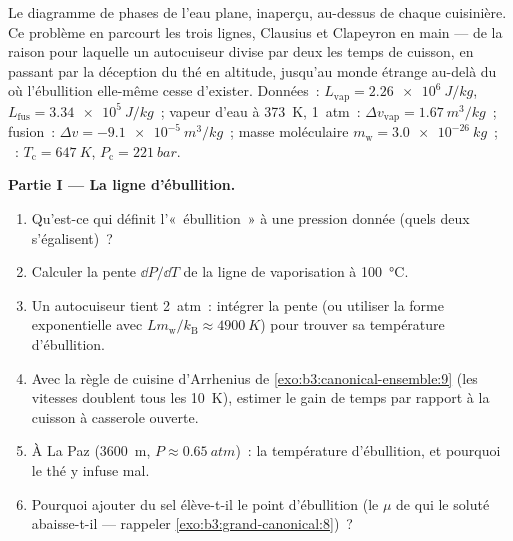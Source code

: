 \begin{problem}\label{pb:b3:phase-transitions:1}
Le diagramme de phases de l'eau plane, inaperçu, au-dessus de chaque
cuisinière. Ce problème en parcourt les trois lignes, Clausius et
Clapeyron en main --- de la raison pour laquelle un autocuiseur
divise par deux les temps de cuisson, en passant par la déception du
thé en altitude, jusqu'au monde étrange au-delà du  où
l'ébullition elle-même cesse d'exister. Données~: $L_{\text{vap}}
= \qty{2.26e6}{J/kg}$, $L_{\text{fus}} = \qty{3.34e5}{J/kg}$~;
vapeur d'eau à \qty{373}{K}, \qty{1}{atm}~: $\Delta v_{\text{vap}}
= \qty{1.67}{m^3/kg}$~; fusion~: $\Delta v = \qty{-9.1e-5}{m^3/kg}$~;
masse moléculaire $m_{\text{w}} = \qty{3.0e-26}{kg}$~; ~: $T_{\text{c}} = \qty{647}{K}$,
$P_{\text{c}} = \qty{221}{bar}$.

\medskip\noindent\textbf{Partie I --- La ligne d'ébullition.}
\begin{enumerate}
  \item Qu'est-ce qui définit l'«~ébullition~» à une pression
        donnée (quels deux  s'égalisent)~?
  \item Calculer la pente $\dd P/\dd T$ de la ligne de
        vaporisation à \qty{100}{\celsius}.
  \item Un autocuiseur tient \qty{2}{atm}~: intégrer la pente (ou
        utiliser la forme exponentielle avec $Lm_{\text{w}}/
        k_{\text{B}} \approx \qty{4900}{K}$) pour trouver sa
        température d'ébullition.
  \item Avec la règle de cuisine d'Arrhenius de
        \cref{exo:b3:canonical-ensemble:9} (les vitesses doublent
        tous les \qty{10}{K}), estimer le gain de temps par rapport
        à la cuisson à casserole ouverte.
  \item À La Paz (\qty{3600}{m}, $P \approx \qty{0.65}{atm}$)~: la
        température d'ébullition, et pourquoi le thé y infuse mal.
  \item Pourquoi ajouter du sel élève-t-il le point d'ébullition
        (le $\mu$ de qui le soluté abaisse-t-il --- rappeler
        \cref{exo:b3:grand-canonical:8})~?
\end{enumerate}


\end{problem}
